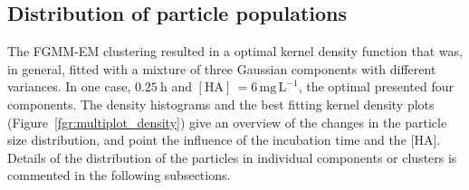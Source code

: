 \documentclass[journal=langd5,manuscript=article]{achemso}
\begin{document}

\subsection{Distribution of particle populations}

The FGMM-EM clustering resulted in a 
optimal  kernel density function that was, in general, fitted with a mixture of three Gaussian components with different variances. In one case, $0.25~\mathrm{h}$ and $\mathrm{[HA]\, = 6\, mg\,L^{-1}}$, the optimal presented four components. The density histograms and the best fitting  kernel density plots (Figure~\ref{fgr:multiplot_density}) give an overview  of the changes in the particle size distribution, and point the influence of the incubation time and the [HA]. Details of the distribution of the particles in  individual components or clusters is commented in the following subsections.
% 
% 
\end{document}
